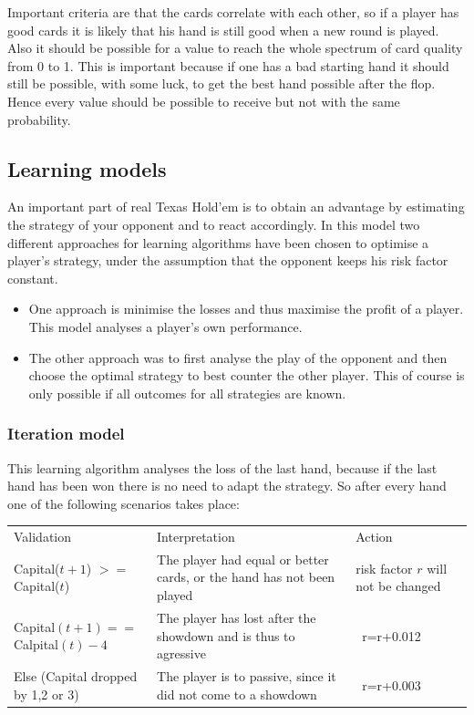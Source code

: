 \documentclass[11pt]{article}
\begin{document}
Important criteria are that the cards correlate with each other, so if a player has good cards it is likely that his hand is still good when a new round is played. Also it should be possible for a value to reach the whole spectrum of card quality from 0 to 1. This is important because if one has a bad starting hand it should still be possible, with some luck, to get the best hand possible after the flop. Hence every value should be possible to receive but not with the same probability.\\


\subsection{Learning models}
An important part of real Texas Hold’em is to obtain an advantage by estimating the strategy of your opponent and to react accordingly.
In this model two different approaches for learning algorithms have been chosen to optimise a player's strategy, under the assumption that the opponent keeps his risk factor constant.
\begin{itemize}
\item One approach is minimise the losses and thus maximise the profit of a player. This model analyses a player's own performance.
\item  The other approach was to first analyse the play of the opponent and then choose the optimal strategy to best counter the other player. This of course is only possible if all outcomes for all strategies are known.\\
\end{itemize}

\subsubsection{Iteration model}
This learning algorithm analyses the loss of the last hand, because if the last hand has been won there is no need to adapt the strategy. So after every hand one of the following scenarios takes place:\\

\renewcommand{\arraystretch}{1.4}
\begin{tabular}{ p{6.45cm}  p{5.1cm}  p{2.4cm}}
Validation & Interpretation & Action\\
\addlinespace
\hline
\hline

Capital($t+1$) $>=$ Capital($t$) &	The player had equal or better cards, or the hand has not been played&
risk factor $r$ will not be changed \\
\addlinespace
Capital$(t+1) ==$ Calpital$(t)-4$	&	The player has lost after the showdown and is thus to agressive & \ r=r+0.012\\
\addlinespace
Else (Capital dropped by 1,2 or 3) &	The player is to passive, since it did not come to a showdown & \ r=r+0.003\\
\end{tabular}
\end{document}
